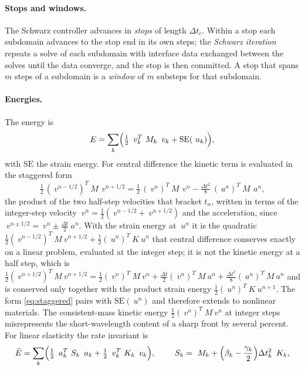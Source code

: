 \documentclass[11pt]{article}
\begin{document}
\paragraph{Stops and windows.} The Schwarz controller advances in
\emph{stops} of length $\Delta t_c$. Within a stop each subdomain advances
to the stop end in its own steps; the \emph{Schwarz iteration} repeats a
solve of each subdomain with interface data exchanged between the solves
until the data converge, and the stop is then committed. A stop that spans
$m$ steps of a subdomain is a \emph{window} of $m$ substeps for that
subdomain.

\paragraph{Energies.} The energy is
\begin{equation}
  E = \sum_k \Bigl(\tfrac12\, ~v_k^T ~M_k\, ~v_k + \mathrm{SE}(~u_k)\Bigr),
  \label{eq:energy}
\end{equation}
with $\mathrm{SE}$ the strain energy. For central difference the kinetic
term is evaluated in the staggered form
\begin{equation}
  \tfrac12\, (~v^{n-1/2})^T ~M\, ~v^{n+1/2}
  = \tfrac12\, (~v^n)^T ~M\, ~v^n - \tfrac{\Delta t^2}{8}\, (~a^n)^T ~M\, ~a^n ,
  \label{eq:staggered}
\end{equation}
the product of the two half-step velocities that bracket $t_n$, written in
terms of the integer-step velocity $~v^n = \tfrac12(~v^{n-1/2} + ~v^{n+1/2})$
and the acceleration, since $~v^{n \pm 1/2} = ~v^n \pm \tfrac{\Delta t}{2} ~a^n$.
With the strain energy at $~u^n$ it is the quadratic
$\tfrac12 (~v^{n-1/2})^T ~M ~v^{n+1/2} + \tfrac12 (~u^n)^T ~K ~u^n$ that
central difference conserves exactly on a linear problem, evaluated at the
integer step; it is not the kinetic energy at a half step, which is
$\tfrac12 (~v^{n+1/2})^T ~M ~v^{n+1/2} = \tfrac12 (~v^n)^T ~M ~v^n
+ \tfrac{\Delta t}{2} (~v^n)^T ~M ~a^n + \tfrac{\Delta t^2}{8} (~a^n)^T ~M ~a^n$
and is conserved only together with the product strain energy
$\tfrac12 (~u^n)^T ~K ~u^{n+1}$. The form \eqref{eq:staggered} pairs with
$\mathrm{SE}(~u^n)$ and therefore extends to nonlinear materials. The
consistent-mass kinetic energy $\tfrac12 (~v^n)^T ~M ~v^n$ at integer steps
misrepresents the short-wavelength content of a sharp front by several
percent. For linear elasticity the rate invariant is
\begin{equation}
  \tilde{E} = \sum_k \Bigl(\tfrac12\, ~a_k^T ~S_k\, ~a_k
             + \tfrac12\, ~v_k^T ~K_k\, ~v_k\Bigr),
  \qquad
  ~S_k = ~M_k + \Bigl(\beta_k - \frac{\gamma_k}{2}\Bigr)\Delta t_k^2\, ~K_k ,
  \label{eq:rate-invariant}
\end{equation}
\end{document}
